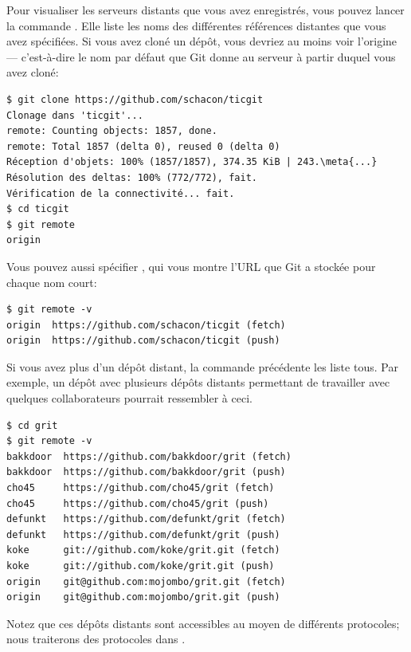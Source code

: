 Pour visualiser les serveurs distants que vous avez enregistrés, vous pouvez lancer la commande .
Elle liste les noms des différentes références distantes que vous avez spécifiées.
Si vous avez cloné un dépôt, vous devriez au moins voir l'origine  --- c'est-à-dire le nom par défaut que Git donne au serveur à partir duquel vous avez cloné:
\begin{Schunk}
\begin{Verbatim}[commandchars=\\\{\}]
$ git clone https://github.com/schacon/ticgit
Clonage dans 'ticgit'...
remote: Counting objects: 1857, done.
remote: Total 1857 (delta 0), reused 0 (delta 0)
Réception d'objets: 100% (1857/1857), 374.35 KiB | 243.\meta{...}
Résolution des deltas: 100% (772/772), fait.
Vérification de la connectivité... fait.
$ cd ticgit
$ git remote
origin
\end{Verbatim}
\end{Schunk}

Vous pouvez aussi spécifier , qui vous montre l'URL que Git a stockée pour chaque nom court:
\begin{Schunk}
\begin{Verbatim}
$ git remote -v
origin	https://github.com/schacon/ticgit (fetch)
origin	https://github.com/schacon/ticgit (push)
\end{Verbatim}
\end{Schunk}

Si vous avez plus d'un dépôt distant, la commande précédente les liste tous.
Par exemple, un dépôt avec plusieurs dépôts distants permettant de travailler avec quelques collaborateurs pourrait ressembler à ceci.
\begin{Schunk}
\begin{Verbatim}
$ cd grit
$ git remote -v
bakkdoor  https://github.com/bakkdoor/grit (fetch)
bakkdoor  https://github.com/bakkdoor/grit (push)
cho45     https://github.com/cho45/grit (fetch)
cho45     https://github.com/cho45/grit (push)
defunkt   https://github.com/defunkt/grit (fetch)
defunkt   https://github.com/defunkt/grit (push)
koke      git://github.com/koke/grit.git (fetch)
koke      git://github.com/koke/grit.git (push)
origin    git@github.com:mojombo/grit.git (fetch)
origin    git@github.com:mojombo/grit.git (push)
\end{Verbatim}
\end{Schunk}

Notez que ces dépôts distants sont accessibles au moyen de différents protocoles; nous traiterons des protocoles dans .

